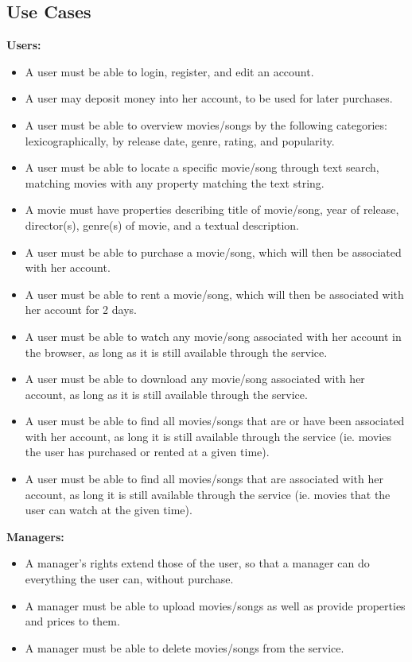 \subsection{Use Cases}
\label{app:usecases}
\textbf{Users:}
\begin{itemize}
\item A user must be able to login, register, and edit an account.
\item A user may deposit money into her account, to be used for later
	purchases.
\item A user must be able to overview movies/songs by the following categories:
	lexicographically, by release date, genre, rating, and popularity.
\item A user must be able to locate a specific movie/song through text search,
	matching movies with any property matching the text string.
\item A movie must have properties describing title of movie/song, year of
	release, director(s), genre(s) of movie, and a textual description.
\item A user must be able to purchase a movie/song, which will then be
	associated with her account.
\item A user must be able to rent a movie/song, which will then be associated
	with her account for 2 days.
\item A user must be able to watch any movie/song associated with her account
	in the browser, as long as it is still available through the service.
\item A user must be able to download any movie/song associated with her
	account, as long as it is still available through the service.
\item A user must be able to find all movies/songs that are or have been
	associated with her account, as long it is still available through the
	service (ie. movies the user has purchased or rented at a given time).
\item A user must be able to find all movies/songs that are associated with her
	account, as long it is still available through the service (ie. movies
	that the user can watch at the given time).
\end{itemize}
\textbf{Managers:}
\begin{itemize}
\item A manager's rights extend those of the user, so that a manager can do
	everything the user can, without purchase.
\item A manager must be able to upload movies/songs as well as provide
	properties and prices to them.
\item A manager must be able to delete movies/songs from the service.
\end{itemize}
